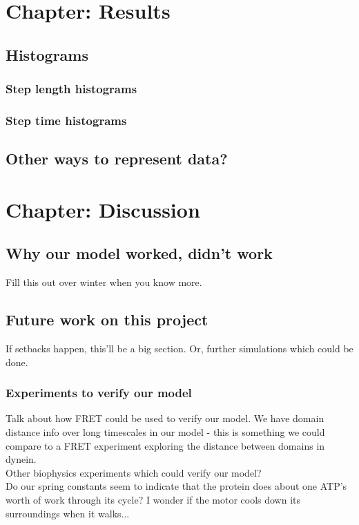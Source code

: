 \documentclass[10pt]{article} %
\begin{document}
\section{Chapter: Results}
	\subsection{Histograms}
		\subsubsection{Step length histograms}
		\subsubsection{Step time histograms}
	\subsection{Other ways to represent data?}

\section{Chapter: Discussion}
\subsection{Why our model worked, didn’t work}
Fill this out over winter when you know more.\\
\subsection{Future work on this project}
If setbacks happen, this'll be a big section. Or, further simulations which could be done.

\subsubsection{Experiments to verify our model}
Talk about how FRET could be used to verify our model. We have domain distance info over long
timescales in our model - this is something we could compare to a FRET experiment exploring
the distance between domains in dynein.\\

Other biophysics experiments which could verify our model?\\

Do our spring constants seem to indicate that the protein does about one ATP's worth of work through its cycle? I wonder if the motor cools down its surroundings when it walks...\\
\end{document}
